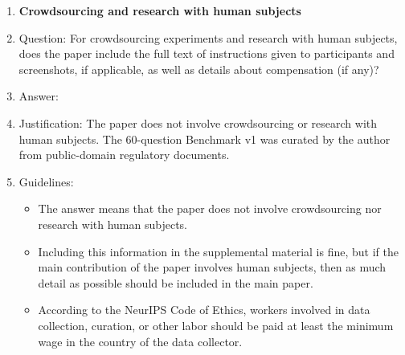 \begin{enumerate}
\item {\bf Crowdsourcing and research with human subjects}
    \item[] Question: For crowdsourcing experiments and research with human subjects, does the paper include the full text of instructions given to participants and screenshots, if applicable, as well as details about compensation (if any)?
    \item[] Answer: \answerNA{}
    \item[] Justification: The paper does not involve crowdsourcing or research with human subjects. The 60-question Benchmark v1 was curated by the author from public-domain regulatory documents.
    \item[] Guidelines:
    \begin{itemize}
        \item The answer \answerNA{} means that the paper does not involve crowdsourcing nor research with human subjects.
        \item Including this information in the supplemental material is fine, but if the main contribution of the paper involves human subjects, then as much detail as possible should be included in the main paper. 
        \item According to the NeurIPS Code of Ethics, workers involved in data collection, curation, or other labor should be paid at least the minimum wage in the country of the data collector. 
    \end{itemize}


\end{enumerate}
